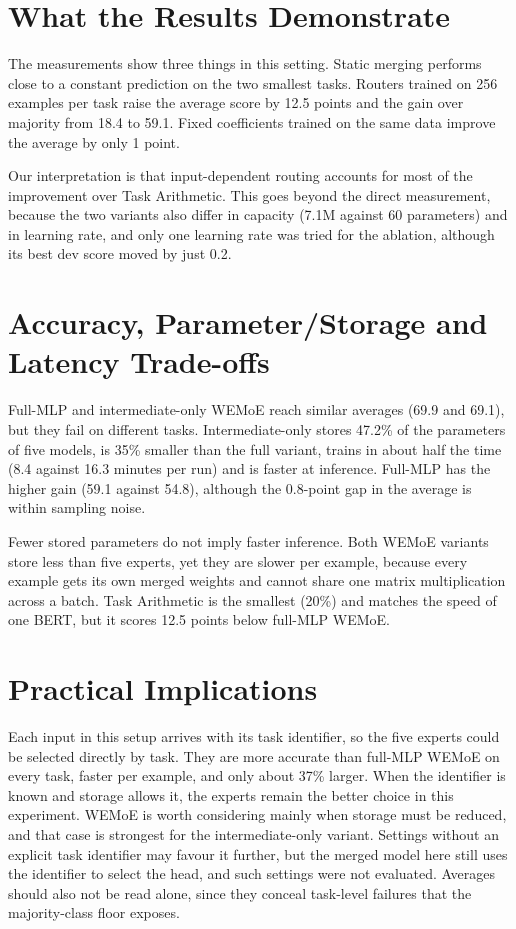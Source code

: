 \section{What the Results Demonstrate}

The measurements show three things in this setting. Static merging performs close to a constant prediction on the two smallest tasks. Routers trained on 256 examples per task raise the average score by 12.5 points and the gain over majority from 18.4 to 59.1. Fixed coefficients trained on the same data improve the average by only 1 point.

Our interpretation is that input-dependent routing accounts for most of the improvement over Task Arithmetic. This goes beyond the direct measurement, because the two variants also differ in capacity (7.1M against 60 parameters) and in learning rate, and only one learning rate was tried for the ablation, although its best dev score moved by just 0.2.

\section{Accuracy, Parameter/Storage and Latency Trade-offs}

Full-MLP and intermediate-only WEMoE reach similar averages (69.9 and 69.1), but they fail on different tasks. Intermediate-only stores 47.2\% of the parameters of five models, is 35\% smaller than the full variant, trains in about half the time (8.4 against 16.3 minutes per run) and is faster at inference. Full-MLP has the higher gain (59.1 against 54.8), although the 0.8-point gap in the average is within sampling noise.

Fewer stored parameters do not imply faster inference. Both WEMoE variants store less than five experts, yet they are slower per example, because every example gets its own merged weights and cannot share one matrix multiplication across a batch. Task Arithmetic is the smallest (20\%) and matches the speed of one BERT, but it scores 12.5 points below full-MLP WEMoE.

\section{Practical Implications}

Each input in this setup arrives with its task identifier, so the five experts could be selected directly by task. They are more accurate than full-MLP WEMoE on every task, faster per example, and only about 37\% larger. When the identifier is known and storage allows it, the experts remain the better choice in this experiment. WEMoE is worth considering mainly when storage must be reduced, and that case is strongest for the intermediate-only variant. Settings without an explicit task identifier may favour it further, but the merged model here still uses the identifier to select the head, and such settings were not evaluated. Averages should also not be read alone, since they conceal task-level failures that the majority-class floor exposes.

